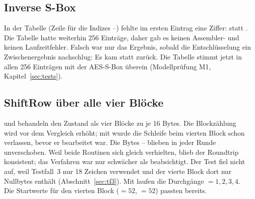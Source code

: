 \subsection{Inverse S-Box}\label{sec:aend-sbox}
In der Tabelle  (Zeile für die Indizes --) fehlte im ersten Eintrag eine Ziffer:  statt . Die Tabelle hatte weiterhin 256 Einträge, daher gab es keinen Assembler- und keinen Laufzeitfehler. Falsch war nur das Ergebnis, sobald die Entschlüsselung ein Zwischenergebnis  nachschlug: Es kam  statt  zurück. Die Tabelle stimmt jetzt in allen 256 Einträgen mit der AES-S-Box überein (Modellprüfung M1, Kapitel~\ref{sec:tests}).

\subsection{ShiftRow über alle vier Blöcke}\label{sec:aend-shiftrow}
 und  behandeln den Zustand als vier Blöcke zu je 16 Bytes. Die Blockzählung  wird vor dem Vergleich erhöht; mit  wurde die Schleife beim vierten Block schon verlassen, bevor er bearbeitet war. Die Bytes -- blieben in jeder Runde unverschoben. Weil beide Routinen sich gleich verhielten, blieb der Roundtrip konsistent; das Verfahren war nur schwächer als beabsichtigt. Der Test fiel nicht auf, weil Testfall~3 nur 18 Zeichen verwendet und der vierte Block dort nur Nullbytes enthält (Abschnitt~\ref{sec:tf3}). Mit  laufen die Durchgänge $=1,2,3,4$. Die Startwerte für den vierten Block ($=52$, $=52$) passten bereits.

